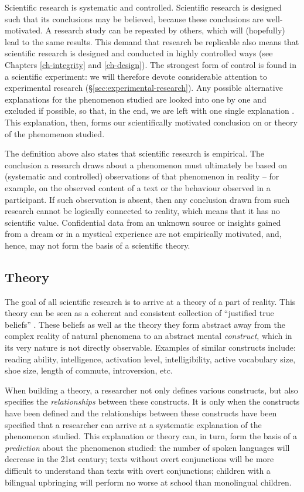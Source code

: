 \documentclass[
]{book}
\begin{document}
Scientific research is systematic and controlled. Scientific research is designed such that its conclusions may be believed, because these conclusions are well-motivated. A research study can be repeated by others, which will (hopefully) lead to the same results. This demand that research be replicable also means that scientific research is designed and conducted in highly controlled ways (see Chapters \ref{ch-integrity} and \ref{ch-design}).
The strongest form of control is found in a scientific experiment: we will therefore devote considerable attention to experimental research (§\ref{sec:experimental-research}). Any possible alternative explanations for the phenomenon studied are looked into one by one and excluded if possible, so that, in the end, we are left with one single explanation \citep{KL00}. This explanation, then, forms our scientifically motivated conclusion on or theory of the phenomenon studied.

The definition above also states that scientific research is empirical. The conclusion a research draws about a phenomenon must ultimately be based on (systematic and controlled) observations of that phenomenon in reality -- for example, on the observed content of a text or the behaviour observed in a participant. If such observation is absent, then any conclusion drawn from such research cannot be logically connected to reality, which means that it has no scientific value. Confidential data from an unknown source or insights gained from a dream or in a mystical experience are not empirically motivated, and, hence, may not form the basis of a scientific theory.

\hypertarget{sec:theory}{%
\subsection{Theory}\label{sec:theory}}

The goal of all scientific research is to arrive at a theory of a part of reality. This theory can be seen as a coherent and consistent collection of ``justified true beliefs'' \citep{Mort03}. These beliefs as well as the theory they form abstract away from the complex reality of natural phenomena to an abstract mental \emph{construct}, which in its very nature is not directly observable. Examples of similar constructs include: reading ability, intelligence, activation level, intelligibility, active vocabulary size, shoe size, length of commute, introversion, etc.

When building a theory, a researcher not only defines various constructs, but also specifies the \emph{relationships} between these constructs. It is only when the constructs have been defined and the relationships between these constructs have been specified that a researcher can arrive at a systematic explanation of the phenomenon studied. This explanation or theory can, in turn, form the basis of a \emph{prediction} about the phenomenon studied: the number of spoken languages will decrease in the 21st century; texts without overt conjunctions will be more difficult to understand than texts with overt conjunctions; children with a bilingual upbringing will perform no worse at school than monolingual children.
\end{document}
